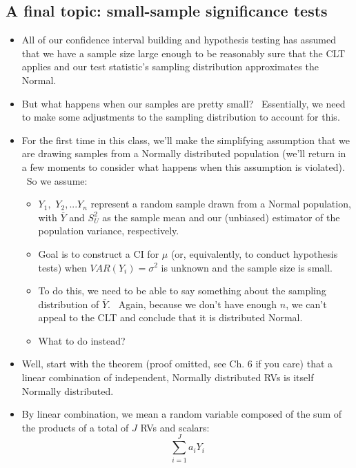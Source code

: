 \documentclass[11pt]{article}
\begin{document}
\subsection{A final topic: small-sample significance tests}

\begin{itemize}
\item All of our confidence interval building and hypothesis testing has
assumed that we have a sample size large enough to be reasonably sure that
the CLT applies and our test statistic's sampling distribution approximates
the Normal.

\item But what happens when our samples are pretty small? \ Essentially, we
need to make some adjustments to the sampling distribution to account for
this. \ 

\item For the first time in this class, we'll make the simplifying
assumption that we are drawing samples from a Normally distributed
population (we'll return in a few moments to consider what happens when this
assumption is violated). \ So we assume:

\begin{itemize}
\item $Y_{1},$ $Y_{2},...Y_{n}$ represent a random sample drawn from a
Normal population, with $\overline{Y}$ and $S_{U}^{2}$ as the sample mean
and our (unbiased) estimator of the population variance, respectively.

\item Goal is to construct a CI for $\mu $ (or, equivalently, to conduct
hypothesis tests) when $VAR(Y_{i})=\sigma ^{2}$ is unknown and the sample
size is small.

\item To do this, we need to be able to say something about the sampling
distribution of $\overline{Y}.$ \ Again, because we don't have enough $n$,
we can't appeal to the CLT and conclude that it is distributed Normal. \ 

\item What to do instead?
\end{itemize}

\item Well, start with the theorem (proof omitted, see Ch. 6 if you care)
that a linear combination of independent, Normally distributed RVs is itself
Normally distributed.

\item By linear combination, we mean a random variable composed of the sum
of the products of a total of $J$ RVs and scalars:%
\begin{equation*}
\sum_{i=1}^{J}a_{i}Y_{i}
\end{equation*}


\end{itemize}
\end{document}

